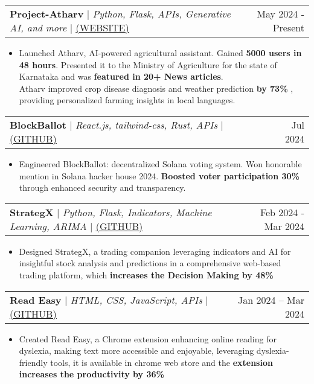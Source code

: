 \documentclass[letterpaper,11pt]{article}
\makeatletter
\newcommand{\resumeItem}[1]{
  \item\small{
    {#1 \vspace{-2pt}}
  }
}
\newcommand{\resumeProjectHeading}[2]{
    \item
    \begin{tabular*}{0.97\textwidth}{l@{\extracolsep{\fill}}r}
      \small#1 & #2 \\
    \end{tabular*}\vspace{-7pt}
}
\newcommand{\resumeItemListStart}{\begin{itemize}}
\newcommand{\resumeItemListEnd}{\end{itemize}\vspace{-5pt}}
\makeatother
\begin{document}
\resumeProjectHeading
          {\textbf{Project-Atharv} $|$ \emph{Python, Flask, APIs, Generative AI, and more} $|$ \href{https://www.atharv.pro}{\underline{(WEBSITE)}}}{May 2024 -  Present } 
          \resumeItemListStart
            \resumeItem{Launched Atharv, AI-powered agricultural assistant. Gained \textbf{5000 users in 48 hours}. Presented it to the Ministry of Agriculture for the state of  Karnataka and was \textbf{featured in 20+ News articles}.  \\
            Atharv improved crop disease diagnosis and weather prediction \textbf{by 73\% }, providing personalized farming insights in local languages.}
             \resumeItemListEnd

            
    \resumeProjectHeading
          {\textbf{BlockBallot} $|$ \emph{React.js, tailwind-css, Rust, APIs } $|$ \href{https://github.com/sherwinvishesh/BlockBallot}{\underline{(GITHUB)}}}{Jul 2024 } 
          \resumeItemListStart
            \resumeItem{Engineered BlockBallot: decentralized Solana voting system. Won honorable mention in Solana hacker house 2024. \textbf{Boosted voter participation 30\% }through enhanced security and transparency.}
            \resumeItemListEnd



    \resumeProjectHeading
          {\textbf{StrategX} $|$ \emph{Python, Flask, Indicators, Machine Learning, ARIMA} $|$ \href{https://github.com/sherwinvishesh/StrategX}{\underline{(GITHUB)}}}{Feb 2024 - Mar 2024 } 
          \resumeItemListStart
            \resumeItem{Designed StrategX, a trading companion leveraging indicators and AI for insightful stock analysis and predictions in a comprehensive web-based trading platform, which \textbf{increases the Decision Making by 48\%}}
            
            
\resumeItemListEnd







      \resumeProjectHeading
          {\textbf{Read Easy} $|$ \emph{HTML, CSS, JavaScript, APIs} $|$ \href{https://github.com/sherwinvishesh/Read-Easy}{\underline{(GITHUB)}}}{Jan 2024 -- Mar 2024}
          \resumeItemListStart
          \resumeItem{Created Read Easy, a Chrome extension enhancing online reading for dyslexia, making text more accessible and enjoyable, leveraging dyslexia-friendly tools, it is available in chrome web store and the \textbf{extension increases the productivity by 36\%}}
\resumeItemListEnd
\end{document}
